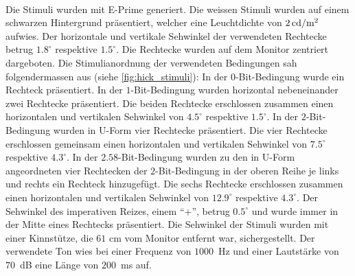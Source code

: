 \documentclass[11pt, twoside, a4paper]{book}		%
\begin{document}
Die Stimuli wurden mit E-Prime\textsuperscript{\textregistered} \citep{eprime} generiert. Die weissen Stimuli wurden auf einem schwarzen Hintergrund präsentiert, welcher eine Leuchtdichte von $2\,\textnormal{cd}/ \textnormal{m}^2$ aufwies. Der horizontale und vertikale Sehwinkel der verwendeten Rechtecke betrug $1.8^{\circ}$ respektive $1.5^{\circ}$. Die Rechtecke wurden auf dem Monitor zentriert dargeboten. Die Stimulianordnung der verwendeten Bedingungen sah folgendermassen aus (siehe \autoref{fig:hick_stimuli}):  In der $0$-Bit-Bedingung wurde ein Rechteck präsentiert. In der $1$-Bit-Bedingung wurden horizontal nebeneinander zwei Rechtecke präsentiert. Die beiden Rechtecke erschlossen zusammen einen horizontalen und vertikalen Sehwinkel von $4.5^{\circ}$ respektive $1.5^{\circ}$. In der $2$-Bit-Bedingung wurden in U-Form vier Rechtecke präsentiert. Die vier Rechtecke erschlossen gemeinsam einen horizontalen und vertikalen Sehwinkel von $7.5^{\circ}$ respektive $4.3^{\circ}$. In der $2.58$-Bit-Bedingung wurden zu den in U-Form angeordneten vier Rechtecken der $2$-Bit-Bedingung in der oberen Reihe je links und rechts ein Rechteck hinzugefügt. Die sechs Rechtecke erschlossen zusammen einen horizontalen und vertikalen Sehwinkel von $12.9^{\circ}$ respektive $4.3^{\circ}$. Der Sehwinkel des imperativen Reizes, einem \enquote{+}, betrug $0.5^{\circ}$ und wurde  immer in der Mitte eines Rechtecks präsentiert. Die Sehwinkel der Stimuli wurden mit einer Kinnstütze, die $61$ cm vom Monitor entfernt war, sichergestellt. Der verwendete Ton wies bei einer Frequenz von $1000$~Hz und einer Lautstärke von $70$~dB eine Länge von $200$~ms auf.
\end{document}
